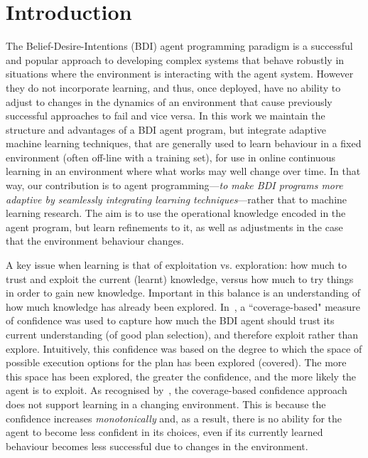 \section{Introduction}\label{sec:introduction}


The Belief-Desire-Intentions (BDI) agent programming paradigm
\cite{WooldridgeBook,BusettaRHL:AL99-JACK,Pokahr:EXP03-JADEX,jasonbook} is a
successful and popular approach to developing complex systems that
behave robustly in situations where the environment is
interacting with the agent system.
However they do not incorporate learning, and thus, once deployed,
have no ability to adjust to changes in the dynamics of an environment
that cause previously successful approaches to fail and vice versa.
In this work we maintain the structure and advantages of a BDI agent
program, but integrate adaptive machine
learning techniques, that are generally used to learn behaviour in a
fixed environment (often off-line with a training set),
for use in online continuous learning in an environment where what
works may well change over time.
In that way, our contribution is to agent programming---{\em to make BDI programs more adaptive by seamlessly integrating learning techniques}---rather that to machine learning research.
The aim is to use the operational knowledge encoded in the
agent program, but learn refinements to it, as well as adjustments in the case that the environment behaviour changes. 


A key issue when learning is that of exploitation
vs. exploration: how much to trust and exploit the current
(learnt) knowledge, versus how much to try things in order to gain new
knowledge. Important in this balance is an understanding of how much
knowledge has already been
explored. In~\cite{singh10:extending,singh10:learning}, a
``coverage-based" measure of confidence was used to capture how much
the BDI agent should trust its current understanding (of good plan
selection), and therefore exploit rather than explore. Intuitively,
this confidence was based on the degree to which the space of possible
execution options for the plan has been explored (covered).
The more this space has been explored, the
greater the confidence, and the more likely the agent is
to exploit.   
%
As recognised by~\cite{singh10:learning}, the coverage-based
confidence approach does not support learning in a changing
environment. This is because the confidence increases
\emph{monotonically} and, as a result, there is no ability for the
agent to become less confident in its choices, even if its currently
learned behaviour becomes less successful due to changes in the
environment. 

